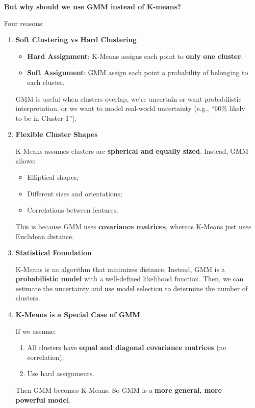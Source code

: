 \highspace
\begin{flushleft}
    \textcolor{Green3}{ \textbf{But why should we use GMM instead of K-means?}}
\end{flushleft}
Four reasons:
\begin{enumerate}
    \item \textcolor{Green3}{\textbf{Soft Clustering vs Hard Clustering}}
    \begin{itemize}
        \item \textbf{Hard Assignment}: K-Means assigns each point to \textbf{only one cluster}.
        \item \textbf{Soft Assignment}: GMM assign each point a probability of belonging to each cluster.
    \end{itemize}
    GMM is useful when clusters overlap, we're uncertain or want probabilistic interpretation, or we want to model real-world uncertainty (e.g., ``60\% likely to be in Cluster 1'').
    
    \item \textcolor{Green3}{\textbf{Flexible Cluster Shapes}}

    K-Means assumes clusters are \textbf{spherical and equally sized}. Instead, GMM allows:
    \begin{itemize}
        \item Elliptical shapes;
        \item Different sizes and orientations;
        \item Correlations between features.
    \end{itemize}
    This is because GMM uses \textbf{covariance matrices}, whereas K-Means just uses Euclidean distance.


    \item \textcolor{Green3}{\textbf{Statistical Foundation}}
    
    K-Means is an algorithm that minimizes distance. Instead, GMM is a \textbf{probabilistic model} with a well-defined likelihood function. Then, we can estimate the uncertainty and use model selection to determine the number of clusters.


    \item \textcolor{Green3}{\textbf{K-Means is a Special Case of GMM}}
    
    If we assume:
    \begin{enumerate}
        \item All clusters have \textbf{equal and diagonal covariance matrices} (no correlation);
        \item Use hard assignments.
    \end{enumerate}
    Then GMM becomes K-Means. So GMM is a \textbf{more general, more powerful model}.
\end{enumerate}
